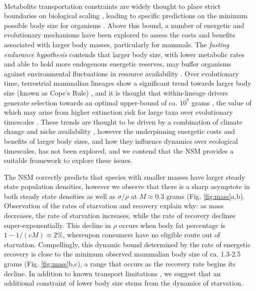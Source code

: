 \documentclass{pnastwo}
\begin{document}
\begin{article}
\vspace{2mm}
 \\ \nonumber
Metabolite transportation constraints are widely thought to place strict boundaries on biological scaling \cite{Brown:1993p708,West:1997cg,Brown:2004wq}, leading to specific predictions on the minimum possible body size for organisms \cite{West:2002ud}.
Above this bound, a number of energetic and evolutionary mechanisms have been explored to assess the costs and benefits associated with larger body masses, particularly for mammals.
The \emph{fasting endurance hypothesis} contends that larger body size, with lower metabolic rates and able to hold more endogenous energetic reserves, may buffer organisms against environmental fluctuations in resource availability \cite{Millar:1990p923}.
Over evolutionary time, terrestrial mammalian lineages show a significant trend towards larger body size (known as Cope's Rule) \cite{Alroy:1998p1594,Clauset:2009fh,Smith:2010p3442,Saarinen:2014br}, and it is thought that within-lineage drivers generate selection towards an optimal upper-bound of ca. $10^7$ grams \cite{Alroy:1998p1594}, the value of which may arise from higher extinction risk for large taxa over evolutionary timescales \cite{Clauset:2009fh}.
These trends are thought to be driven by a combination of climate change and niche availability \cite{Saarinen:2014br}, however the underpinning energetic costs and benefits of larger body sizes, and how they influence dynamics over ecological timescales, has not been explored, and we contend that the NSM provides a suitable framework to explore these issues.

The NSM correctly predicts that species with smaller masses have larger steady state population densities, however we observe that there is a sharp asymptote in both steady state densities as well as $\sigma/\rho$ at $M \approx 0.3$ grams  (Fig. \ref{fig:mass}a,b).
Observation of the rates of starvation and recovery explain why: as mass decreases, the rate of starvation increases, while the rate of recovery declines super-exponentially.
This decline in $\rho$ occurs when body fat percentage is $1 - 1/(cM) \approx 2\%$, whereupon consumers have no eligible route out of starvation.
Compellingly, this dynamic bound determined by the rate of energetic recovery is close to the minimum observed mammalian body size of ca. 1.3-2.5 grams (Fig. \ref{fig:mass}b,c), a range that occurs as the recovery rate begins its decline.
In addition to known transport limitations \cite{West:2002ud}, we suggest that an additional constraint of lower body size stems from the dynamics of starvation.


\end{article}
\end{document}
